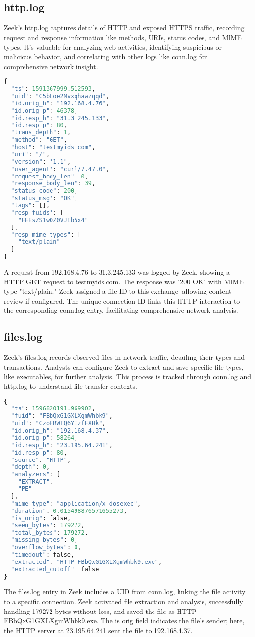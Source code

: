 \subsection{http.log}
Zeek's http.log captures details of HTTP and exposed HTTPS traffic, recording request and response information like methods, URIs, status codes, and MIME types. It's valuable for analyzing web activities, identifying suspicious or malicious behavior, and correlating with other logs like conn.log for comprehensive network insight.
\begin{lstlisting}[language=Python, caption= http.log entry]
{
  "ts": 1591367999.512593,
  "uid": "C5bLoe2Mvxqhawzqqd",
  "id.orig_h": "192.168.4.76",
  "id.orig_p": 46378,
  "id.resp_h": "31.3.245.133",
  "id.resp_p": 80,
  "trans_depth": 1,
  "method": "GET",
  "host": "testmyids.com",
  "uri": "/",
  "version": "1.1",
  "user_agent": "curl/7.47.0",
  "request_body_len": 0,
  "response_body_len": 39,
  "status_code": 200,
  "status_msg": "OK",
  "tags": [],
  "resp_fuids": [
    "FEEsZS1w0Z0VJIb5x4"
  ],
  "resp_mime_types": [
    "text/plain"
  ]
}
\end{lstlisting}
A request from 192.168.4.76 to 31.3.245.133 was logged by Zeek, showing a HTTP GET request to testmyids.com. The response was "200 OK" with MIME type "text/plain." Zeek assigned a file ID to this exchange, allowing content review if configured. The unique connection ID links this HTTP interaction to the corresponding conn.log entry, facilitating comprehensive network analysis.

\subsection{files.log}
Zeek's files.log records observed files in network traffic, detailing their types and transactions. Analysts can configure Zeek to extract and save specific file types, like executables, for further analysis. This process is tracked through conn.log and http.log to understand file transfer contexts.
\begin{lstlisting}[language=Python, caption= files.log entry]
{
  "ts": 1596820191.969902,
  "fuid": "FBbQxG1GXLXgmWhbk9",
  "uid": "CzoFRWTQ6YIzfFXHk",
  "id.orig_h": "192.168.4.37",
  "id.orig_p": 58264,
  "id.resp_h": "23.195.64.241",
  "id.resp_p": 80,
  "source": "HTTP",
  "depth": 0,
  "analyzers": [
    "EXTRACT",
    "PE"
  ],
  "mime_type": "application/x-dosexec",
  "duration": 0.015498876571655273,
  "is_orig": false,
  "seen_bytes": 179272,
  "total_bytes": 179272,
  "missing_bytes": 0,
  "overflow_bytes": 0,
  "timedout": false,
  "extracted": "HTTP-FBbQxG1GXLXgmWhbk9.exe",
  "extracted_cutoff": false
}
\end{lstlisting}
The files.log entry in Zeek includes a UID from conn.log, linking the file activity to a specific connection. Zeek activated file extraction and analysis, successfully handling 179272 bytes without loss, and saved the file as HTTP-FBbQxG1GXLXgmWhbk9.exe. The is orig field indicates the file's sender; here, the HTTP server at 23.195.64.241 sent the file to 192.168.4.37.
